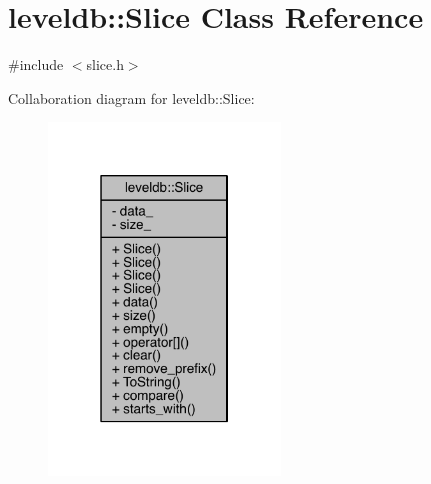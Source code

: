 \hypertarget{classleveldb_1_1_slice}{}\section{leveldb\+:\+:Slice Class Reference}
\label{classleveldb_1_1_slice}


{\ttfamily \#include $<$slice.\+h$>$}



Collaboration diagram for leveldb\+:\+:Slice\+:\nopagebreak
\begin{figure}[H]
\begin{center}
\leavevmode
\includegraphics[width=175pt]{classleveldb_1_1_slice__coll__graph}
\end{center}
\end{figure}
